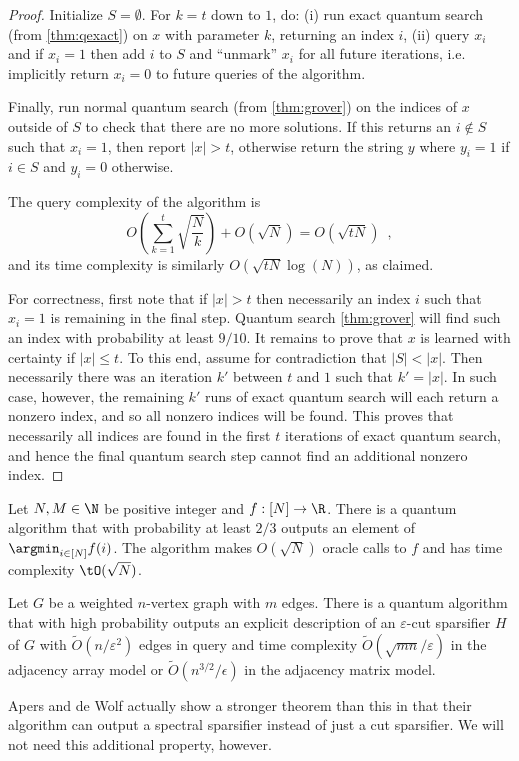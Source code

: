 \begin{proof}
Initialize $S = \emptyset$.  For $k = t$ down to $1$, do: (i) run exact quantum search (from \cref{thm:qexact}) on $x$ with parameter $k$, returning an index $i$, (ii) query $x_i$ and if $x_i = 1$ then 
add $i$ to $S$ and ``unmark'' $x_i$ for all future iterations, i.e. implicitly return $x_i = 0$ to future queries of the algorithm.

Finally, run normal quantum search (from \cref{thm:grover}) on the indices of $x$ outside of $S$ to check that there are no more solutions.
If this returns an $i \not \in S$ such that $x_i = 1$, then report $|x| > t$, otherwise return the string $y$ where $y_i =1$ if $i \in S$ and 
$y_i = 0$ otherwise.

The query complexity of the algorithm is
\[
O\left( \sum_{k=1}^{t} \sqrt{\frac{N}{k}} \right) + O(\sqrt{N}) = O(\sqrt{t N}) \enspace ,
\]
and its time complexity is similarly $O(\sqrt{tN} \log(N))$, as claimed.

For correctness, first note that if $|x| > t$ then necessarily an index $i$ such that $x_i = 1$ is remaining in the final step.
Quantum search \cref{thm:grover} will find such an index with probability at least $9/10$.
It remains to prove that $x$ is learned with certainty if $|x| \le t$.
To this end, assume for contradiction that $|S| < |x|$.
Then necessarily there was an iteration $k'$ between $t$ and $1$ such that $k' = |x|$.
In such case, however, the remaining $k'$ runs of exact quantum search will each return a nonzero index, and so all nonzero indices will be found.
This proves that necessarily all indices are found in the first $t$ iterations of exact quantum search, and hence the final quantum search step cannot find an additional nonzero index.
\end{proof}

\begin{theorem}
\label{thm:qmin}
Let $N,M \in \N$ be positive integer and $f: [N] \rightarrow \R$.  There is a quantum algorithm that with probability at least $2/3$ outputs an element of $\argmin_{i \in [N]} f(i)$.
The algorithm makes $O(\sqrt{N})$ oracle calls to $f$ and has time complexity $\tO(\sqrt{N})$.
\end{theorem}

\begin{theorem}
\label{thm:qsparsifier}
Let $G$ be a weighted $n$-vertex graph with $m$ edges.  There is a quantum algorithm that with high probability outputs an explicit description of an 
$\varepsilon$-cut sparsifier $H$ of $G$ with $\tilde O(n/\varepsilon^2)$ edges in query and time complexity $\tilde O(\sqrt{mn}/\varepsilon)$ in the adjacency array model or $\tilde O(n^{3/2}/\epsilon)$ in the adjacency matrix model.
\end{theorem}
Apers and de Wolf actually show a stronger theorem than this in that their algorithm can output a spectral sparsifier instead of 
just a cut sparsifier.  We will not need this additional property, however.

